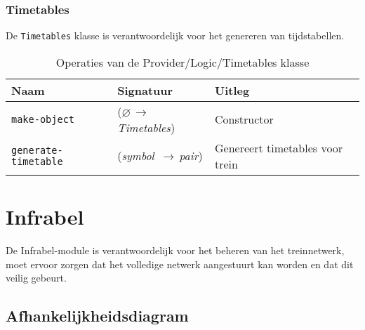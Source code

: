 \documentclass[a4paper, 11pt]{article}
\newcommand{\naar}{\,$\rightarrow$\,}
\renewcommand{\empty}{$\varnothing$}
\newcommand{\<}{\scriptsize\textless\normalsize}
\renewcommand{\>}{\scriptsize\textgreater\normalsize}
\begin{document}
\subsubsection{Timetables} %
De \texttt{Timetables} klasse is verantwoordelijk voor het genereren van tijdstabellen.
\begin{table}[H]
	\begin{center}
		\begin{tabular}{|l l l|}
			\hline
			\textbf{Naam} & \textbf{Signatuur} & \textbf{Uitleg}\\
			\hline
			\texttt{make-object} & (\empty \naar \textit{Timetables}) & Constructor\\
			\hline
			\texttt{generate-timetable} & (\textit{symbol} \naar \textit{pair}) & Genereert timetables voor trein\\
			\hline
		\end{tabular}
		\caption{Operaties van de Provider/Logic/Timetables klasse}
	\end{center}
\end{table}

\section{Infrabel} %
De Infrabel-module is verantwoordelijk voor het beheren van het treinnetwerk, moet ervoor zorgen dat het volledige netwerk aangestuurt kan worden en dat dit veilig gebeurt.

\subsection{Afhankelijkheidsdiagram} %
\begin{center}
\end{center}
\end{document}

